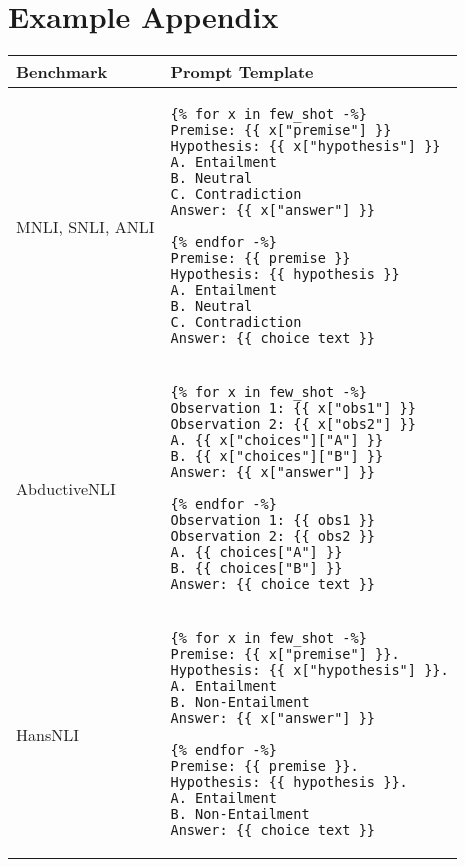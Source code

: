 \section{Example Appendix}
\label{sec:appendix}

\begin{table*}
    \centering
    \small
    \begin{tabular}{lp{8cm}}
        \toprule
        \textbf{Benchmark} & \textbf{Prompt Template} \\
        \midrule
        MNLI, SNLI, ANLI & \begin{verbatim}
{% for x in few_shot -%}
Premise: {{ x["premise"] }}
Hypothesis: {{ x["hypothesis"] }}
A. Entailment
B. Neutral
C. Contradiction
Answer: {{ x["answer"] }}

{% endfor -%}
Premise: {{ premise }}
Hypothesis: {{ hypothesis }}
A. Entailment
B. Neutral
C. Contradiction
Answer: {{ choice_text }}
\end{verbatim} \\
\midrule
AbductiveNLI & \begin{verbatim}
{% for x in few_shot -%}
Observation 1: {{ x["obs1"] }}
Observation 2: {{ x["obs2"] }}
A. {{ x["choices"]["A"] }}
B. {{ x["choices"]["B"] }}
Answer: {{ x["answer"] }}

{% endfor -%}
Observation 1: {{ obs1 }}
Observation 2: {{ obs2 }}
A. {{ choices["A"] }}
B. {{ choices["B"] }}
Answer: {{ choice_text }}
\end{verbatim} \\
\midrule
HansNLI & \begin{verbatim}
{% for x in few_shot -%}
Premise: {{ x["premise"] }}.
Hypothesis: {{ x["hypothesis"] }}.
A. Entailment
B. Non-Entailment
Answer: {{ x["answer"] }}

{% endfor -%}
Premise: {{ premise }}.
Hypothesis: {{ hypothesis }}.
A. Entailment
B. Non-Entailment
Answer: {{ choice_text }}
\end{verbatim} \\
\bottomrule
    \end{tabular}
\caption{Prompt Templates for each task}
\label{tab:prompt_template}
\end{table*}